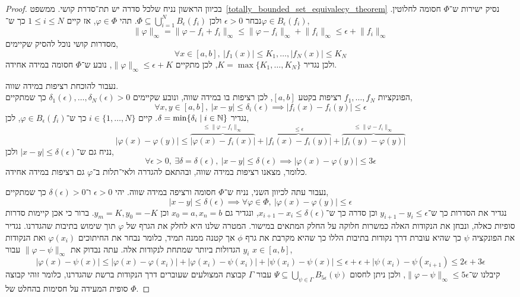 \begin{proof}
	בכיוון הראשון נניח שלכל סדרה יש תת־סדרת קושי.
	ממשפט\ \ref{totally_bounded_set_equivalecy_theorem} נסיק ישירות ש־$\Phi$ חסומה לחלוטין.
	נבחר $\epsilon > 0$ ולכן $\Phi \subseteq \bigcup_{i = 1}^N B_\epsilon(f_i)$.
	תהי $\varphi \in \Phi$, אז קיים $1 \le i \le N$ כך ש־$\varphi \in B_\epsilon(f_i)$,
	\[
		\lVert \varphi \rVert_\infty
		= \lVert \varphi - f_i + f_i \rVert_\infty
		\le \lVert \varphi - f_i \rVert_\infty + \lVert f_i \rVert_\infty
		\le \epsilon + \lVert f_i \rVert_\infty
	\]
	מסדרות קושי נוכל להסיק שקיימים,
	\[
		\forall x \in [a, b],\ |f_1(x)| \le K_1, \dots, |f_N(x)| \le K_N
	\]
	ולכן נגדיר $K = \max\{ K_1, \dots, K_N \}$, לכן מתקיים $\lVert \varphi \rVert_\infty \le \epsilon + K$, נובע ש־$\Phi$ חסומה במידה אחידה.

	נעבור להוכחת רציפות במידה שווה. \\
	הפונקציות $f_1, \dots, f_N$ רציפות בקטע $[a, b]$, לכן רציפות בו במידה שווה, ונובע שקיימים $\delta_1(\epsilon), \ldots, \delta_N(\epsilon) > 0$ כך שמתקיים,
	\[
		\forall x, y \in [a, b],\ 
		|x - y| \le \delta_i(\epsilon)
		\implies |f_i(x) - f_i(y)| \le \epsilon
	\]
	נגדיר $\delta = \min\{ \delta_i \mid i \in \mathbb{N} \}$.
	קיים $i \in \{1, \ldots, N\}$ כך ש־$\varphi \in B_\epsilon(f_i)$, לכן,
	\[
		|\varphi(x) - \varphi(y)|
		\le \overbrace{|\varphi(x) - f_i(x)|}^{\le \lVert \varphi - f_i\rVert_\infty} + \overbrace{|f_i(x) - f_i(y)|}^{\le \epsilon} + \overbrace{|f_i(y) - \varphi(y)|}^{\le \lVert \varphi - f_i\rVert_\infty}
	\]
	נניח גם ש־$|x - y| \le \delta(\epsilon)$ ולכן,
	\[
		\forall \epsilon > 0,\ \exists \delta = \delta(\epsilon),\ |x - y| \le \delta(\epsilon)
		\implies |\varphi(x) - \varphi(y)| \le 3 \epsilon
	\]
	כלומר, מצאנו רציפות במידה שווה, ובהתאם להגדרה ולאי־תלות ב־$\varphi$ גם רציפות במידה אחידה.

	נעבור עתה לכיוון השני, נניח ש־$\Phi$ חסומה ורציפה במידה שווה.
	יהי $\epsilon > 0$ ו־$\delta(\epsilon) > 0$ כך שמתקיים,
	\[
		|x - y| \le \delta(\epsilon)
		\implies \forall \varphi \in \Phi,\ |\varphi(x) - \varphi(y)| \le \epsilon
	\]
	נגדיר את הסדרות כך ש־$y_{i + 1} - y_i \le \epsilon$ וכן סדרה כך ש־$x_{i + 1} - x_i \le \delta(\epsilon)$, ונגדיר גם $x_0 = a, x_n = b$ וכן $y_m = K, y_0 = -K$.
	ברור כי אכן קיימות סדרות סופיות כאלה, ונבחן את הנקודות האלה כמשרות חלוקה על החלק המתאים במישור.
	המטרה שלנו היא לחלק את הגרף של $\varphi$ תוך שימוש בתיבות שהגדרנו.
	נגדיר את הפונקציה $\psi$ כך שהיא עוברת דרך נקודות בתיבות הללו כך שהיא מקרבת את גרף $\phi$ אך קטנה ממנה תמיד, כלומר נבחר את החיתוכים $\varphi(x_i)$ ואת הנקודות $y_i$ הגדולות ביותר שמתחת לנקודות אלה.
	עתה נבדוק את $\lVert \varphi - \psi \rVert_\infty$ עבור $x \in [a, b]$,
	\[
		|\varphi(x) - \psi(x)|
		\le |\varphi(x) - \varphi(x_i)| + |\varphi(x_i) - \psi(x_i)| + |\psi(x_i) - \psi(x)|
		\le \epsilon + \epsilon + |\psi(x_i) - \psi(x_{i + 1})
		\le 2 \epsilon + 3 \epsilon
	\]
	קיבלנו ש־$\lVert \varphi - \psi \rVert_\infty \le 5 \epsilon$, ולכן ניתן לחסום $\Psi \subseteq \bigcup_{\psi \in \Gamma} B_{5 \epsilon}(\psi)$ עבור $\Gamma$ קבוצת המצולעים שעוברים דרך הנקודות ברשת שהגדרנו,
	כלומר זוהי קבוצה סופית המעידה על חסימות בהחלט של $\Phi$.
\end{proof}
